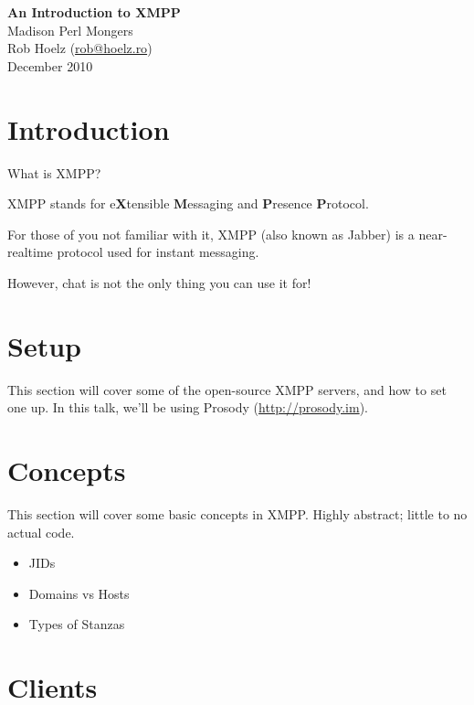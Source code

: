 \documentclass{article}
\begin{document}
\begin{titlepage}
\vspace*{\fill}
\begin{center}
{\huge \bfseries An Introduction to XMPP} \\[0.5cm]
{\LARGE Madison Perl Mongers} \\[0.5cm]
{\large Rob Hoelz (\href{mailto:rob@hoelz.ro}{rob@hoelz.ro})} \\[0.5cm]
{\large December 2010}
\end{center}
\vspace*{\fill}
\end{titlepage}

\newpage
\part{Introduction}

\newpage
What is XMPP?

\newpage
XMPP stands for e\textbf{X}tensible \textbf{M}essaging and \textbf{P}resence \textbf{P}rotocol.

\newpage
For those of you not familiar with it, XMPP (also known as Jabber) is a near-realtime
protocol used for instant messaging.

\newpage
However, chat is not the only thing you can use it for!

\newpage
\part{Setup}

\newpage
This section will cover some of the open-source XMPP servers, and
how to set one up.  In this talk, we'll be using Prosody (\url{http://prosody.im}).

\newpage
\part{Concepts}

\newpage
This section will cover some basic concepts in XMPP.  Highly abstract; little to no
actual code.

\begin{itemize}
\item JIDs
\item Domains vs Hosts
\item Types of Stanzas
\end{itemize}

\newpage
\part{Clients}
\end{document}

